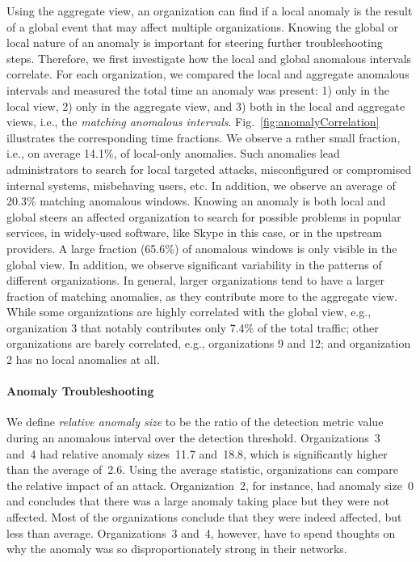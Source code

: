 \documentclass[letterpaper,11pt,onecolumn,titlepage]{article}
\begin{document}
Using the aggregate view, an organization can find if a local anomaly
is the result of a global event that may affect multiple
organizations. Knowing the global or local nature of an anomaly is
important for steering further troubleshooting steps. Therefore, we
first investigate how the local and global anomalous intervals
correlate. For each organization, we compared the local and aggregate
anomalous intervals and measured the total time an anomaly was
present: 1) only in the local view, 2) only in the aggregate view, and
3) both in the local and aggregate views, i.e., the {\it matching
anomalous intervals}. Fig.~\ref{fig:anomalyCorrelation} illustrates
the corresponding time fractions. We
observe a rather small fraction, i.e., on average 14.1\%, of
local-only anomalies. Such anomalies lead administrators to
search for local targeted attacks, misconfigured or compromised
internal systems, misbehaving users, etc.  In addition, we observe an
average of 20.3\% matching anomalous windows. Knowing an anomaly is
both local and global steers an affected organization to search
for possible problems in popular services, in widely-used software,
like Skype in this case, or in the upstream providers.
A large fraction (65.6\%) of
anomalous windows is only visible in the global view.
In addition, we observe significant variability in the patterns of
different organizations. In general, larger organizations tend to have
a larger fraction of matching anomalies, as they contribute more to
the aggregate view. While some organizations are highly correlated
with the global view, e.g., organization 3 that notably contributes
only 7.4\% of the total traffic; other organizations are barely
correlated, e.g., organizations 9 and 12; and organization 2 has no
local anomalies at all.




\paragraph{Anomaly Troubleshooting}
We define {\it relative anomaly size} to be the ratio of the detection
metric value during an anomalous interval over the detection
threshold.  Organizations~3 and~4 had relative anomaly sizes~11.7
and~18.8, which is significantly higher than the average of~2.6. Using the
average statistic, organizations can compare the relative impact of an
attack. Organization~2, for instance, had anomaly size~0 and 
concludes that there was a large anomaly taking place but they were not
affected.  Most of the organizations conclude that they were
indeed affected, but less than average.  Organizations~3 and~4,
however, have to spend thoughts on why the anomaly was so
disproportionately strong in their networks.
\end{document}
